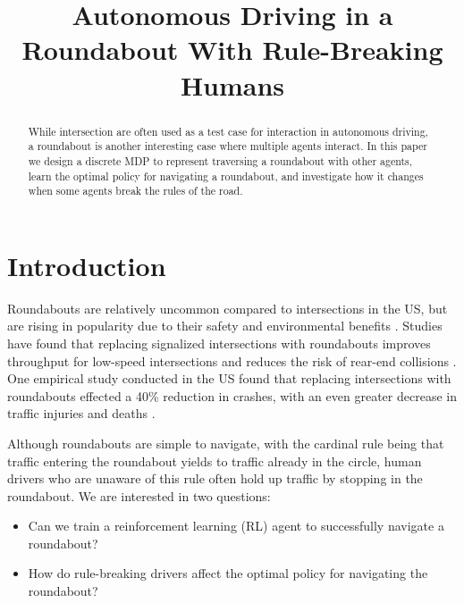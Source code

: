 \documentclass[conference]{IEEEtran}
\begin{document}
\title{Autonomous Driving in a Roundabout With Rule-Breaking Humans}

\author{
}

\maketitle

\begin{abstract}
While intersection are often used as a test case for interaction in autonomous driving, a roundabout is another interesting case where multiple agents interact. In this paper we design a discrete MDP to represent traversing a roundabout with other agents, learn the optimal policy for navigating a roundabout, and investigate how it changes when some agents break the rules of the road.
\end{abstract}


\section{Introduction}
Roundabouts are relatively uncommon compared to intersections in the US,
but are rising in popularity due to their safety and environmental benefits \cite{MANDAVILLI2008135}. Studies have found that replacing signalized intersections with roundabouts improves throughput for low-speed intersections \cite{persaud2001safety} and reduces the risk of rear-end collisions \cite{saccomanno2008comparing}. One empirical study conducted in the US found that replacing intersections with roundabouts effected a 40\% reduction in crashes, with an even greater decrease in traffic injuries and deaths \cite{persaud2001safety}.

Although roundabouts are simple to navigate, with the cardinal rule being that traffic entering the roundabout yields to traffic already in the circle, human drivers who are unaware of this rule often hold up traffic by stopping in the roundabout. We are interested in two questions:
\begin{itemize}
	\item Can we train a reinforcement learning (RL) agent to successfully navigate a roundabout?
	\item How do rule-breaking drivers affect the optimal policy for navigating the roundabout?
\end{itemize}
\end{document}
